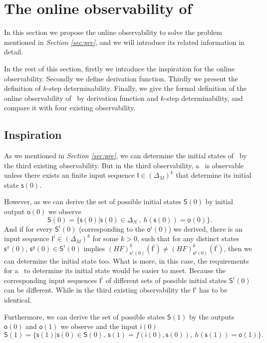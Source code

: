 \section{The online observability of \BCNs}
\label{sec:online}

In this section we propose the online observability to solve the problem mentioned in {\em Section \ref{sec:pre}}, and we will introduce its related information in detail. 

In the rest of this section, firstly we introduce the inspiration for the online observability. Secondly we define derivation function. Thirdly we present the definition of $k$-step determinability. Finally, we give the formal definition of the online observability of \BCNs\ by derivation function and $k$-step determinability, and compare it with four existing observability.

\subsection{Inspiration}


As we mentioned in {\em Section \ref{sec:pre}}, we can determine the initial states of \BCNs\ by the third existing observability. But in the third observability, a \BCN\ is observable unless there exists an finite input sequence $\mathsf{I}\in(\Delta_M)^k$ that determine its initial state $\mathsf{s}(0)$. 

However, as we can derive the set of possible initial states $\mathsf{S}(0)$ by initial output $\mathsf{o}(0)$ we observe
\[\mathsf{S}(0)=\{\mathsf{s}(0)|\mathsf{s}(0)\in \Delta_N\ ,\ h( \mathsf{s}(0))=\mathsf{o}(0)\}.\]
And if for every $\mathsf{S}^{i}(0)$ (corresponding to the $\mathsf{o}^{i}(0)$) we derived, there is an input sequence $\mathsf{I}^{i}\in(\Delta_M)^k$ for some $k>0$, such that for any distinct states $\mathsf{s}^{x}(0)$, $\mathsf{s}^{y}(0) \in \mathsf{S}^{i}(0)$ implies $(HF)^k_{\mathsf{s}^{x}(0)}(\mathsf{I^i})\neq (HF)^k_{\mathsf{s}^{y}(0)}(\mathsf{I^i})$,
then we can determine the initial state too. 
What is more, in this case, the requirements for a \BCN\ to determine its initial state would be easier to meet. Because the corresponding input sequences $\mathsf{I}^{i}$ of different sets of possible initial states $\mathsf{S}^{i}(0)$ can be different. While in the third existing observability the $\mathsf{I}^{i}$ has to be identical.

Furthermore, we can derive the set of possible states $\mathsf{S}(1)$ by the outputs $\mathsf{o}(0)$ and $\mathsf{o}(1)$ we observe and the input $\mathsf{i}(0)$ 
\[\mathsf{S}(1)=\{\mathsf{s}(1)|\mathsf{s}(0)\in \mathsf{S}(0),\ \mathsf{s}(1)=f({\mathsf{i}(0)},{\mathsf{s}(0)}),\ h(\mathsf{s}(1))=\mathsf{o}(1)\}.\]

